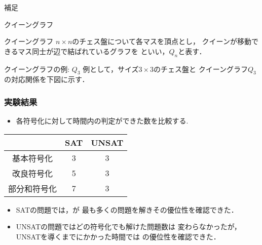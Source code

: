 \appendix
\backupbegin

\begin{frame}{}
 補足
\end{frame}

\begin{frame}{クイーングラフ}
 \begin{block}{クイーングラフ}
  $n\times n$のチェス盤について各マスを頂点とし，
  クイーンが移動できるマス同士が辺で結ばれているグラフを
  といい，$Q_n$と表す．
 \end{block}
 \begin{exampleblock}{クイーングラフの例: $Q_3$}
  例として，サイズ$3 \times 3$のチェス盤と
  クイーングラフ$Q_3$の対応関係を下図に示す．
  \begin{figure}[htb]
   \label{ex:queengraph_3}
   \begin{minipage}[b]{0.2\linewidth}
    \centering
    
   \end{minipage} 
   \begin{minipage}[b]{0.5\linewidth}
    \centering
    
   \end{minipage}
  \end{figure}
 \end{exampleblock}
\end{frame}

\begin{frame}\frametitle{実験結果}
 \begin{itemize}
  \item 各符号化に対して時間内の判定ができた数を比較する.
 \end{itemize}
 \begin{block}{}
  \begin{table}[ht]
   \centering
   \begin{tabular}{c|c|c}
    &SAT &UNSAT \\ \hline
    基本符号化 &3 &3 \\
    改良符号化 &5 &3 \\
    部分和符号化 &{\color{red}7} &3 \\ \hline
   \end{tabular}
  \end{table}
  \begin{itemize}
   \item SATの問題では，が
	 最も多くの問題を解きその優位性を確認できた．
   \item UNSATの問題ではどの符号化でも解けた問題数は
	 変わらなかったが，UNSATを導くまでにかかった時間では
	 の優位性を確認できた．
  \end{itemize}
 \end{block}
\end{frame}

\backupend